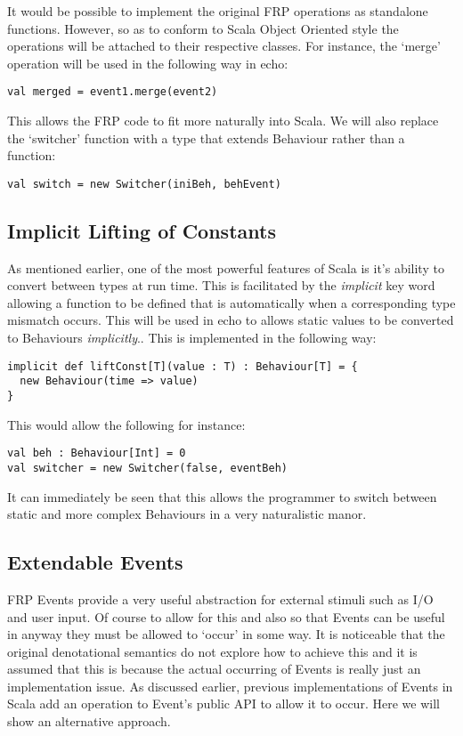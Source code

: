       It would be possible to implement the original FRP operations as standalone functions. However, so
      as to conform to Scala Object Oriented style the operations will be attached to their respective
      classes. For instance, the `merge' operation will be used in the following way in echo:
      
\begin{verbatim}
val merged = event1.merge(event2)
\end{verbatim}

    This allows the FRP code to fit more naturally into Scala. We will also replace the `switcher' function
    with a type that extends Behaviour rather than a function:
    
\begin{verbatim}
val switch = new Switcher(iniBeh, behEvent)
\end{verbatim}

    \subsection{Implicit Lifting of Constants}
      As mentioned earlier, one of the most powerful features of Scala is it's ability to convert between
      types at run time. This is facilitated by the \emph{implicit} key word allowing a function to be defined
      that is automatically when a corresponding type mismatch occurs. This will be used in echo to allows 
      static values to be converted to Behaviours \emph{implicitly}.. This is implemented in the following way:  

\begin{verbatim}
implicit def liftConst[T](value : T) : Behaviour[T] = {
  new Behaviour(time => value)
}
\end{verbatim}              
      
      This would allow the following for instance:

\begin{verbatim}
val beh : Behaviour[Int] = 0
val switcher = new Switcher(false, eventBeh)
\end{verbatim}       

      It can immediately be seen that this allows the programmer to switch between static and more complex
      Behaviours in a very naturalistic manor.
      
    \subsection{Extendable Events}
      FRP Events provide a very useful abstraction for external stimuli such as I/O and user input. Of course
      to allow for this and also so that Events can be useful in anyway they must be allowed to `occur' in some way.
      It is noticeable that the original denotational semantics \cite{Elliott1997} do not explore how to achieve
      this and it is assumed that this is because the actual occurring of Events is really just an implementation
      issue. As discussed earlier, previous implementations of Events in Scala add an operation to Event's
      public API to allow it to occur. Here we will show an alternative approach.
      

